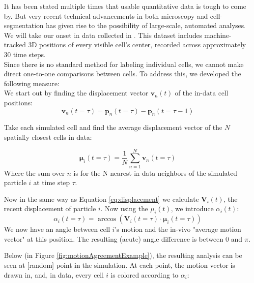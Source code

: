It has been stated multiple times that usable quantitative data is tough to come by. But very recent technical advancements in both microscopy and cell-segmentation has given rise to the possibility of large-scale, automated analyses. \cite{stern2022deconstructing} We will take our onset in data collected in . This dataset includes machine-tracked 3D positions of every visible cell’s center, recorded across approximately 30 time steps.\\

Since there is no standard method for labeling individual cells, we cannot make direct one-to-one comparisons between cells. To address this, we developed the following measure:\\

We start out by finding the displacement vector $\boldsymbol{v}_n(t)$ of the in-data cell positions:
\begin{equation}
\label{eq:displacement}
\boldsymbol{v}_n(t=\tau) =\boldsymbol{p}_n(t=\tau) - \boldsymbol{p}_n(t=\tau-1)
\end{equation}


Take each simulated cell and find the average displacement vector of the $N$ spatially closest cells in data:

\begin{equation}
    \boldsymbol{\mu}_i(t=\tau) = \frac{1}{N} \sum_{n=1}^{N}\boldsymbol{v}_n(t=\tau)
\end{equation}
Where the sum over $n$ is for the N nearest in-data neighbors of the simulated particle $i$ at time step $\tau$.

Now in the same way as Equation \ref{eq:displacement} we calculate $\boldsymbol{V}_i(t)$, the recent displacement of particle $i$. Now using the $\mu_i(t)$, we introduce $\alpha_i(t)$:
\begin{equation}
    \alpha_i(t=\tau) = \arccos\left(\boldsymbol{V}_i(t=\tau)\cdot\boldsymbol{\mu}_i(t=\tau)\right)
\end{equation}
We now have an angle between cell $i$'s motion and the in-vivo "average motion vector" at this position.
The resulting (acute) angle difference is between 0 and $\pi$. 

Below (in Figure  \ref{fig:motionAgreementExample}), the resulting analysis can be seen at [random] point in the simulation. At each point, the motion vector is drawn in, and, in data, every cell $i$ is colored according to $\alpha_i$:

